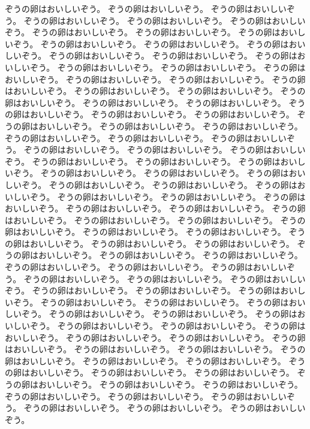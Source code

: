 ぞうの卵はおいしいぞう。
ぞうの卵はおいしいぞう。
ぞうの卵はおいしいぞう。
ぞうの卵はおいしいぞう。
ぞうの卵はおいしいぞう。
ぞうの卵はおいしいぞう。
ぞうの卵はおいしいぞう。
ぞうの卵はおいしいぞう。
ぞうの卵はおいしいぞう。
ぞうの卵はおいしいぞう。
ぞうの卵はおいしいぞう。
ぞうの卵はおいしいぞう。
ぞうの卵はおいしいぞう。
ぞうの卵はおいしいぞう。
ぞうの卵はおいしいぞう。
ぞうの卵はおいしいぞう。
ぞうの卵はおいしいぞう。
ぞうの卵はおいしいぞう。
ぞうの卵はおいしいぞう。
ぞうの卵はおいしいぞう。
ぞうの卵はおいしいぞう。
ぞうの卵はおいしいぞう。
ぞうの卵はおいしいぞう。
ぞうの卵はおいしいぞう。
ぞうの卵はおいしいぞう。
ぞうの卵はおいしいぞう。
ぞうの卵はおいしいぞう。
ぞうの卵はおいしいぞう。
ぞうの卵はおいしいぞう。
ぞうの卵はおいしいぞう。
ぞうの卵はおいしいぞう。
ぞうの卵はおいしいぞう。
ぞうの卵はおいしいぞう。
ぞうの卵はおいしいぞう。
ぞうの卵はおいしいぞう。
ぞうの卵はおいしいぞう。
ぞうの卵はおいしいぞう。
ぞうの卵はおいしいぞう。
ぞうの卵はおいしいぞう。
ぞうの卵はおいしいぞう。
ぞうの卵はおいしいぞう。
ぞうの卵はおいしいぞう。
ぞうの卵はおいしいぞう。
ぞうの卵はおいしいぞう。
ぞうの卵はおいしいぞう。
ぞうの卵はおいしいぞう。
ぞうの卵はおいしいぞう。
ぞうの卵はおいしいぞう。
ぞうの卵はおいしいぞう。
ぞうの卵はおいしいぞう。
ぞうの卵はおいしいぞう。
ぞうの卵はおいしいぞう。
ぞうの卵はおいしいぞう。
ぞうの卵はおいしいぞう。
ぞうの卵はおいしいぞう。
ぞうの卵はおいしいぞう。
ぞうの卵はおいしいぞう。
ぞうの卵はおいしいぞう。
ぞうの卵はおいしいぞう。
ぞうの卵はおいしいぞう。
ぞうの卵はおいしいぞう。
ぞうの卵はおいしいぞう。
ぞうの卵はおいしいぞう。
ぞうの卵はおいしいぞう。
ぞうの卵はおいしいぞう。
ぞうの卵はおいしいぞう。
ぞうの卵はおいしいぞう。
ぞうの卵はおいしいぞう。
ぞうの卵はおいしいぞう。
ぞうの卵はおいしいぞう。
ぞうの卵はおいしいぞう。
ぞうの卵はおいしいぞう。
ぞうの卵はおいしいぞう。
ぞうの卵はおいしいぞう。
ぞうの卵はおいしいぞう。
ぞうの卵はおいしいぞう。
ぞうの卵はおいしいぞう。
ぞうの卵はおいしいぞう。
ぞうの卵はおいしいぞう。
ぞうの卵はおいしいぞう。
ぞうの卵はおいしいぞう。
ぞうの卵はおいしいぞう。
ぞうの卵はおいしいぞう。
ぞうの卵はおいしいぞう。
ぞうの卵はおいしいぞう。
ぞうの卵はおいしいぞう。
ぞうの卵はおいしいぞう。
ぞうの卵はおいしいぞう。
ぞうの卵はおいしいぞう。
ぞうの卵はおいしいぞう。
ぞうの卵はおいしいぞう。
ぞうの卵はおいしいぞう。
ぞうの卵はおいしいぞう。
ぞうの卵はおいしいぞう。
ぞうの卵はおいしいぞう。
ぞうの卵はおいしいぞう。
ぞうの卵はおいしいぞう。
ぞうの卵はおいしいぞう。
ぞうの卵はおいしいぞう。
ぞうの卵はおいしいぞう。
ぞうの卵はおいしいぞう。
ぞうの卵はおいしいぞう。
